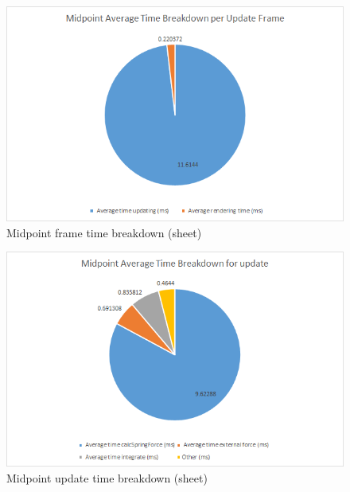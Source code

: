     \begin{figure}
    \begin{center}
      \includegraphics[scale=.9]{Figures/sheet_m_ft}
    \end{center}
    \caption{Midpoint frame time breakdown (sheet)}
    \label{fig:m ft sheet}
  \end{figure}
  
    \begin{figure}
    \begin{center}
      \includegraphics[scale=.9]{Figures/sheet_m_ut}
    \end{center}
    \caption{Midpoint update time breakdown (sheet)}
    \label{fig:m ut sheet}
  \end{figure}

